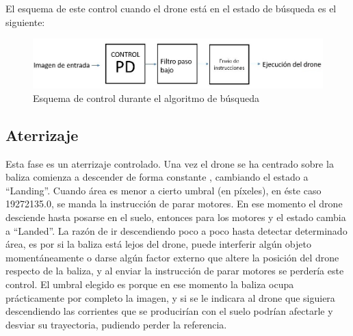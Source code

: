 \hspace{1 cm} El esquema de este control cuando el drone est\'a en el estado de b\'usqueda es el siguiente:
\begin{figure}[ht]
	\centering
		\includegraphics[width=1\textwidth]{imgs/esquemapd2.png}
        \caption{Esquema de control durante el algoritmo de b\'usqueda}
	\label{fig:Esquema_control}
\end{figure}


\subsection{Aterrizaje}

\hspace{1 cm} Esta fase es un aterrizaje controlado. Una vez el drone se ha centrado sobre la baliza comienza a descender de forma constante , cambiando el estado a "`Landing"'. Cuando \'area es menor a cierto umbral (en p\'ixeles), en \'este caso 19272135.0, se manda la instrucci\'on de parar motores. En ese momento el drone desciende hasta posarse en el suelo, entonces para los motores y el estado cambia a "`Landed"'. La raz\'on de ir descendiendo poco a poco hasta detectar determinado \'area, es por si la baliza est\'a lejos del drone, puede interferir alg\'un objeto moment\'aneamente o darse alg\'un factor externo que altere la posici\'on del drone respecto de la baliza, y al enviar la instrucci\'on de parar motores se perder\'ia este control. El umbral elegido es porque en ese momento la baliza ocupa pr\'acticamente por completo la imagen, y si se le indicara al drone que siguiera descendiendo las corrientes que se producir\'ian con el suelo podr\'ian afectarle y desviar su trayectoria, pudiendo perder la referencia.








